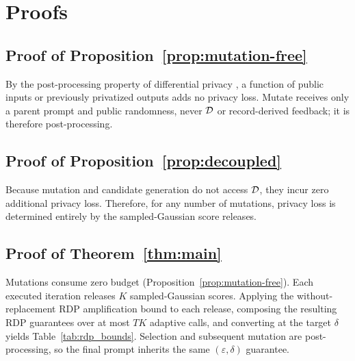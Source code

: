 \vspace{-0.4em}
\section{Proofs}
\label{sec:appendix:proofs}

\vspace{-0.3em}
\subsection{Proof of Proposition~\ref{prop:mutation-free}}
By the post-processing property of differential privacy \cite{dwork2014algorithmic}, a function of public inputs or previously privatized outputs adds no privacy loss. Mutate receives only a parent prompt and public randomness, never $\mathcal{D}$ or record-derived feedback; it is therefore post-processing.

\vspace{-0.3em}
\subsection{Proof of Proposition~\ref{prop:decoupled}}
Because mutation and candidate generation do not access $\mathcal{D}$, they incur zero additional privacy loss. Therefore, for any number of mutations, privacy loss is determined entirely by the sampled-Gaussian score releases.

\vspace{-0.3em}
\subsection{Proof of Theorem~\ref{thm:main}}
Mutations consume zero budget (Proposition~\ref{prop:mutation-free}). Each executed iteration releases $K$ sampled-Gaussian scores. Applying the without-replacement RDP amplification bound to each release, composing the resulting RDP guarantees over at most $TK$ adaptive calls, and converting at the target $\delta$ yields Table~\ref{tab:rdp_bounds}. Selection and subsequent mutation are post-processing, so the final prompt inherits the same $(\varepsilon,\delta)$ guarantee.
